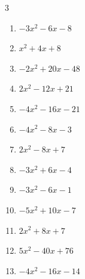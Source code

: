 \begin{multicols}{3}
\begin{enumerate}

  \item $-3x^{2}-6x-8$


  \item $x^{2}+4x+8$


\columnbreak %

  \item $-2x^{2}+20x-48$


  \item $2x^{2}-12x+21$


  \item $-4x^{2}-16x-21$


  \item $-4x^{2}-8x-3$


  \item $2x^{2}-8x+7$


  \item $-3x^{2}+6x-4$


  \item $-3x^{2}-6x-1$


  \item $-5x^{2}+10x-7$


  \item $2x^{2}+8x+7$


  \item $5x^{2}-40x+76$


\columnbreak %

\resetques

  \item $-4x^{2}-16x-14$


\end{enumerate}
\end{multicols}
